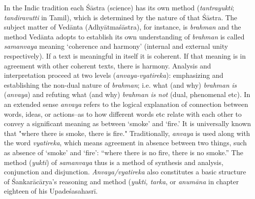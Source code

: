 In the Indic tradition each Śāstra (science) has its own method (\textit{tantrayukti}; \textit{tandiravutti} in Tamil), which is determined by the nature of that Śāstra. The subject matter of Vedānta (Adhyātmaśāstra), for instance, is \textit{brahman} and the method Vedānta adopts to establish its own understanding of \textit{brahman} is called \textit{samanvaya} meaning ‘coherence and harmony’ (internal and external unity respectively). If a text is meaningful in itself it is coherent. If that meaning is in agreement with other coherent texts, there is harmony. Analysis and interpretation proceed at two levels (\textit{anvaya-vyatireka}): emphasizing and establishing the non-dual nature of \textit{brahman}; i.e. what (and why) \textit{brahman is} (\textit{anvaya}) and refuting what (and why) \textit{brahman is not} (dual, phenomenal etc). In an extended sense \textit{anvaya} refers to the logical explanation of connection between words, ideas, or actions--as to how different words etc relate with each other to convey a significant meaning as between ‘smoke’ and ‘fire.’ It is universally known that "where there is smoke, there is fire." Traditionally, \textit{anvaya} is used along with the word \textit{vyatireka}, which means agreement in absence between two things, such as absence of ‘smoke’ and ‘fire’: “where there is no fire, there is no smoke.” The method (\textit{yukti}) of \textit{samanvaya} thus is a method of synthesis and analysis, conjunction and disjunction. \textit{Anvaya/vyatireka} also constitutes a basic structure of Śankarācārya’s reasoning and method (\textit{yukti, tarka}, or \textit{anumāna} in chapter eighteen of his Upadeśasahasrī.

